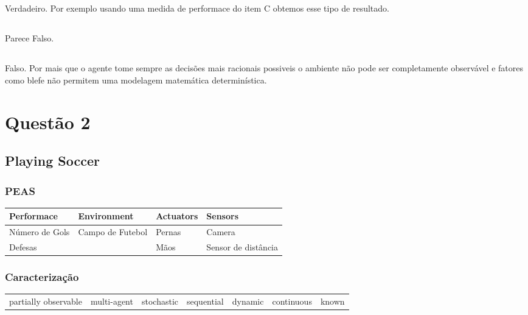 \documentclass[a4paper,12pt]{article}
\begin{document}
\subsection{}

Verdadeiro. Por exemplo usando uma medida de performace do item C obtemos esse tipo de resultado.

\subsection{}

Parece Falso.

\subsection{}

\subsection{}

Falso. Por mais que o agente tome sempre as decisões mais racionais possiveis o ambiente não pode ser completamente observável e fatores como blefe não permitem uma modelagem matemática determinística.

\section{Questão 2}
\subsection{Playing Soccer}
\subsubsection{PEAS}
\begin{table}[h!]
\begin{tabular}{l|l|l|l}
\hline
Performace & Environment & Actuators & Sensors \\
\hline
Número de Gols & Campo de Futebol & Pernas & Camera \\
Defesas & & Mãos & Sensor de distância \\
\end{tabular}
\end{table}
\subsubsection{Caracterização}
\begin{table}[h!]
\begin{tabular}{|c|c|c|c|c|c|c|}
\hline
partially observable & multi-agent & stochastic & sequential & dynamic & continuous & known
\end{tabular}
\end{table}
\end{document}

